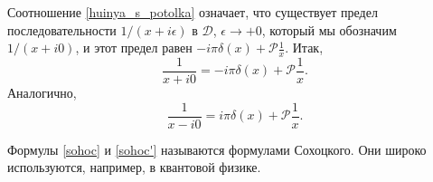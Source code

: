 Соотношение \eqref{huinya_s_potolka} означает, что существует предел последовательности $1/(x + i \epsilon)$ в $\mathcal{D}$, $\epsilon \to +0$, который мы обозначим $1/(x + i0)$, и этот предел равен $-i \pi \delta(x) + \mathcal{P}{\frac{1}{x}}$. Итак,
\begin{equation}
	\label{sohoc}
	\frac{1}{x + i 0} = - i \pi \delta(x) + \mathcal{P}{\frac{1}{x}}.
\end{equation}
Аналогично, 
\begin{equation}
	\label{sohoc'}
	\frac{1}{x - i0} = i \pi \delta(x) + \mathcal{P}{\frac{1}{x}}. 
\end{equation}

Формулы \eqref{sohoc} и \eqref{sohoc'} называются формулами Сохоцкого. Они широко используются, например, в квантовой физике.



